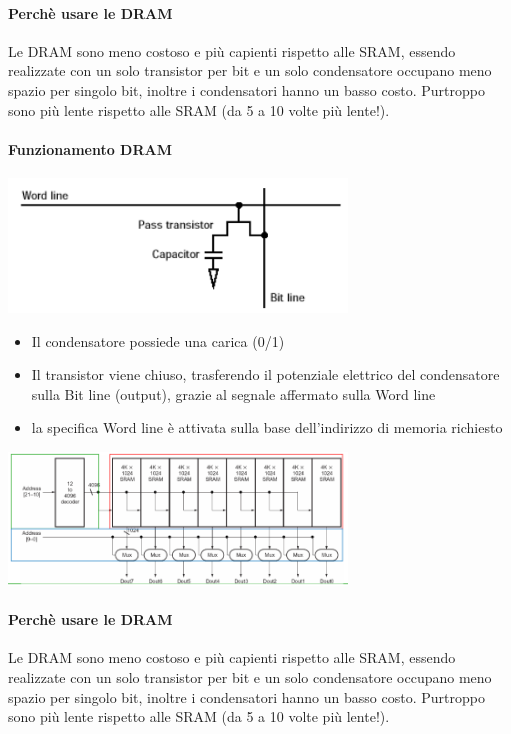 \documentclass[12pt, a4paper, openany]{book}
\begin{document}
\paragraph{Perchè usare le DRAM}
Le DRAM sono meno costoso e più capienti rispetto alle SRAM, essendo realizzate
con un solo transistor per bit e un solo condensatore occupano meno spazio per singolo
bit, inoltre i condensatori hanno un basso costo.
Purtroppo sono più lente rispetto alle SRAM (da 5 a 10 volte più lente!). 

\paragraph{Funzionamento DRAM} 
\begin{center}
    \includegraphics[width=90mm, scale=0.5]{DRAM struttura.png}
\end{center}
\begin{itemize}
    \item Il condensatore possiede una carica (0/1)
    \item Il transistor viene chiuso, trasferendo il potenziale elettrico del condensatore
    sulla Bit line (output), grazie al segnale affermato sulla Word line
    \item la specifica Word line è attivata sulla base dell'indirizzo di memoria richiesto
\end{itemize}\begin{center}
    \includegraphics[width=90mm, scale=0.5]{SRAM a 2 livelli.png}
\end{center}
\paragraph{Perchè usare le DRAM}
Le DRAM sono meno costoso e più capienti rispetto alle SRAM, essendo realizzate
con un solo transistor per bit e un solo condensatore occupano meno spazio per singolo
bit, inoltre i condensatori hanno un basso costo.
Purtroppo sono più lente rispetto alle SRAM (da 5 a 10 volte più lente!). 
\end{document}
